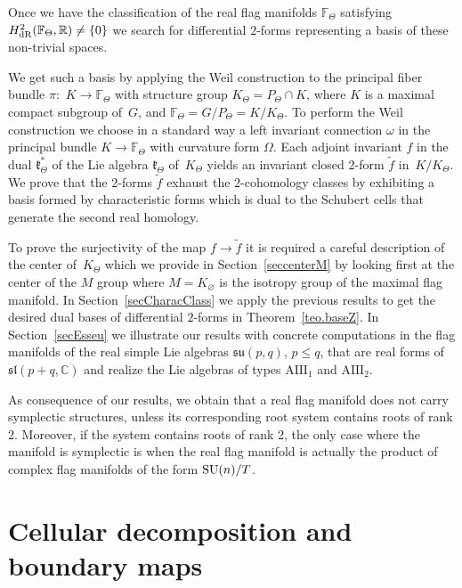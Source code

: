\documentclass[pdftex]{sigma}
\numberwithin{equation}{section}
\begin{document}
Once we have the classification of the real flag manifolds $\mathbb{F}_{\Theta }$ satisfying $H_{\rm dR}^{2}(\mathbb{F}_{\Theta },\mathbb{R})\neq \{0\}$ we search for differential $2$-forms representing a basis of these non-trivial spaces.

We get such a basis by applying the Weil construction to the principal fiber bundle $\pi \colon$ $K\longrightarrow \mathbb{F}_{\Theta }$ with structure group $K_{\Theta }=P_{\Theta }\cap K$, where $K$ is a maximal compact subgroup of~$G$, and $\mathbb{F}_{\Theta }=G/P_{\Theta }=K/K_{\Theta }$. To perform the Weil construction we choose in a standard way a left invariant connection $\omega $ in the principal bundle $K\longrightarrow \mathbb{F}_{\Theta }$ with curvature form $\Omega $. Each adjoint invariant $f$ in the dual $\mathfrak{k}_{\Theta }^{\ast }$ of the Lie algebra $\mathfrak{k}_{\Theta }$ of~$K_{\Theta }$ yields an invariant closed $2$-form $\widetilde{f}$ in~$K/K_{\Theta }$. We prove that the $2$-forms $\widetilde{f}$ exhaust the $2$-cohomology classes by exhibiting a basis formed by characteristic forms which is dual to the Schubert cells that generate the second real homology.

To prove the surjectivity of the map $f\rightarrow \widetilde{f}$ it is required a careful description of the center of~$K_{\Theta }$ which we provide in Section~\ref{seccenterM} by looking first at the center of the $M$ group where $M=K_{\varnothing }$ is the isotropy group of the maximal flag manifold. In Section~\ref{secCharacClass} we apply the previous results to get the desired dual bases of differential $2$-forms in Theorem~\ref{teo.baseZ}. In Section~\ref{secEsseu} we illustrate our results with concrete computations in the flag manifolds of the real simple Lie algebras $\mathfrak{su}(p,q) $, $p\leq q$, that are real forms of $\mathfrak{sl} ( p+q,\mathbb{C} ) $ and realize the Lie algebras of types $\mathrm{AIII}_{1}$ and $\mathrm{AIII}_{2}$.

As consequence of our results, we obtain that a real flag manifold does not carry symplectic structures, unless its corresponding root system contains roots of rank 2. Moreover, if the system contains roots of rank 2, the only case where the manifold is symplectic is when the real flag manifold is actually the product of complex flag manifolds of the form ${\rm SU}(n)/T$.

\section{Cellular decomposition and boundary maps}\label{section2}
\end{document}
